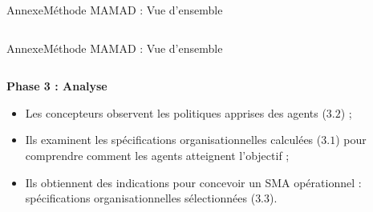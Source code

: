 \begin{frame}{Annexe}{Méthode MAMAD : Vue d’ensemble}
\begin{columns}
    \end{columns}

\end{frame}

\begin{frame}{Annexe}{Méthode MAMAD : Vue d’ensemble}

    \begin{columns}

        \begin{column}{0.6\textwidth}

            \textbf{Phase 3 : Analyse}

            \begin{itemize}
                \item Les concepteurs observent les politiques apprises des agents ($3.2$) ;
                \item Ils examinent les spécifications organisationnelles calculées ($3.1$) pour comprendre comment les agents atteignent l’objectif ;
                \item Ils obtiennent des indications pour concevoir un SMA opérationnel : spécifications organisationnelles sélectionnées ($3.3$).
            \end{itemize}

        \end{column}


\end{columns}
\end{frame}
